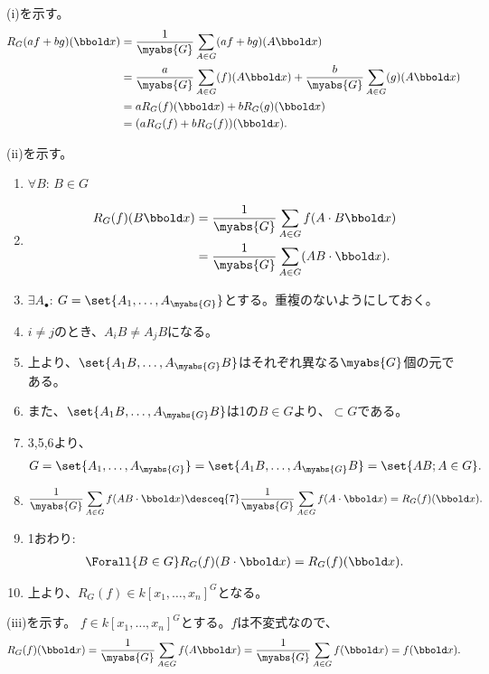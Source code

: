 \begin{myproof}
  (i)を示す。
  \begin{align}
    R_G(af+bg)(\bbold x)
    &=
    \frac{1}{\myabs{G}}\sum_{A\in G}(af+bg)(A\bbold x)\\
    &=
    \frac{a}{\myabs{G}}\sum_{A\in G}(f)(A\bbold x)
    +
    \frac{b}{\myabs{G}}\sum_{A\in G}(g)(A\bbold x)
    \\
    &=
    a R_G(f)(\bbold x) + b R_G(g)(\bbold x)\\
    &=
    (aR_G(f) + bR_G(f))(\bbold x).
  \end{align}

  (ii)を示す。
  \begin{enumerate}
    \item
    $\forall B$: $B\in G$
    \item
    \begin{align}
      R_G(f)(B\bbold x)
      &=
      \frac{1}{\myabs{G}}\sum_{A\in G}f(A\cdot B\bbold x)\\
      &=
      \frac{1}{\myabs{G}}\sum_{A\in G}(AB\cdot \bbold x).
    \end{align}
    \item
    $\exists A_\bullet$: $G=\set{A_1,\dots,A_{\myabs{G}}}$とする。重複のないようにしておく。
    \item
    $i\neq j$のとき、$A_i B \neq A_j B$になる。
    \item
    上より、$\set{A_1 B,\dots,A_{\myabs{G}}B}$はそれぞれ異なる$\myabs{G}$個の元である。
    \item
    また、$\set{A_1 B,\dots,A_{\myabs{G}}B}$は1の$B\in G$より、$\subset G$である。
    \item
    3,5,6より、
    \begin{align}
      G=\set{A_1,\dots,A_{\myabs{G}}}
      =
      \set{A_1 B,\dots,A_{\myabs{G}} B}
      =
      \set{AB; A\in G}.
    \end{align}
    \item
    \begin{align}
      \frac{1}{\myabs{G}}\sum_{A\in G}f(AB\cdot \bbold x)
      \desceq{7}
      \frac{1}{\myabs{G}}\sum_{A\in G}f(A\cdot \bbold x)
      =
      R_G(f)(\bbold x).
    \end{align}
    \item
    1おわり:
    \begin{align}
      \Forall{B\in G} R_G(f)(B\cdot \bbold x) = R_G(f)(\bbold x).
    \end{align}
    \item
    上より、$R_G(f) \in k[x_1,\dots,x_n]^G$となる。
  \end{enumerate}

  (iii)を示す。
  $f\in k[x_1,\dots,x_n]^G$とする。$f$は不変式なので、
  \begin{align}
    R_G(f)(\bbold x)
    =
    \frac{1}{\myabs{G}}\sum_{A\in G}f(A\bbold x)
    =
    \frac{1}{\myabs{G}}\sum_{A\in G}f(\bbold x)
    =
    f(\bbold x).
  \end{align}
\end{myproof}

